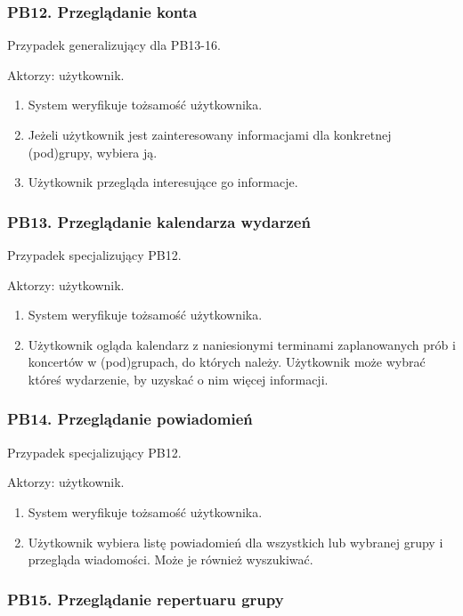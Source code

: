 \documentclass[11pt,a4paper]{article}
\renewcommand{\_}{\char`_}
\begin{document}
\subsubsection{PB12. Przeglądanie konta}

Przypadek generalizujący dla PB13-16.

Aktorzy: użytkownik.
\begin{enumerate}
    \item System weryfikuje tożsamość użytkownika.
    \item Jeżeli użytkownik jest zainteresowany informacjami dla konkretnej (pod)grupy, wybiera ją.
    \item Użytkownik przegląda interesujące go informacje.
\end{enumerate}

\subsubsection{PB13. Przeglądanie kalendarza wydarzeń}

Przypadek specjalizujący PB12.

Aktorzy: użytkownik.
\begin{enumerate}
    \item System weryfikuje tożsamość użytkownika.
    \item Użytkownik ogląda kalendarz z naniesionymi terminami zaplanowanych prób i koncertów w (pod)grupach, do których należy. Użytkownik może wybrać któreś wydarzenie, by uzyskać o nim więcej informacji.
\end{enumerate}

\subsubsection{PB14. Przeglądanie powiadomień}

Przypadek specjalizujący PB12.

Aktorzy: użytkownik.
\begin{enumerate}
    \item System weryfikuje tożsamość użytkownika.
    \item Użytkownik wybiera listę powiadomień dla wszystkich lub wybranej grupy i przegląda wiadomości. Może je również wyszukiwać.
\end{enumerate}


\subsubsection{PB15. Przeglądanie repertuaru grupy}
\end{document}
